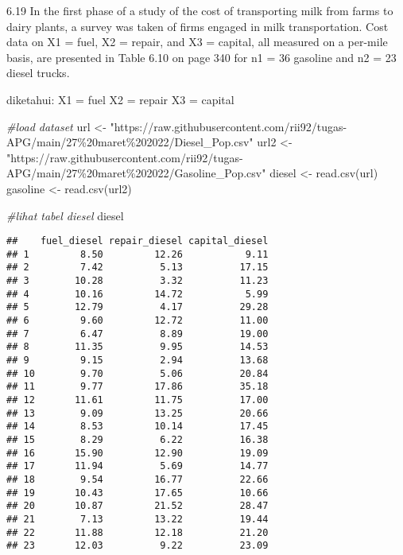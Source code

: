 \documentclass[
]{article}
\newenvironment{Shaded}{\begin{snugshade}}{\end{snugshade}}
\newcommand{\CommentTok}[1]{\textcolor[rgb]{0.56,0.35,0.01}{\textit{#1}}}
\newcommand{\FunctionTok}[1]{\textcolor[rgb]{0.00,0.00,0.00}{#1}}
\newcommand{\NormalTok}[1]{#1}
\newcommand{\OtherTok}[1]{\textcolor[rgb]{0.56,0.35,0.01}{#1}}
\newcommand{\StringTok}[1]{\textcolor[rgb]{0.31,0.60,0.02}{#1}}
\begin{document}
6.19 In the first phase of a study of the cost of transporting milk from
farms to dairy plants, a survey was taken of firms engaged in milk
transportation. Cost data on X1 = fuel, X2 = repair, and X3 = capital,
all measured on a per-mile basis, are presented in Table 6.10 on page
340 for n1 = 36 gasoline and n2 = 23 diesel trucks.

diketahui: X1 = fuel X2 = repair X3 = capital

\begin{Shaded}
\begin{Highlighting}[]
\CommentTok{\#load dataset}
\NormalTok{url }\OtherTok{\textless{}{-}} \StringTok{"https://raw.githubusercontent.com/rii92/tugas{-}APG/main/27\%20maret\%202022/Diesel\_Pop.csv"}
\NormalTok{url2 }\OtherTok{\textless{}{-}} \StringTok{"https://raw.githubusercontent.com/rii92/tugas{-}APG/main/27\%20maret\%202022/Gasoline\_Pop.csv"}
\NormalTok{diesel }\OtherTok{\textless{}{-}} \FunctionTok{read.csv}\NormalTok{(url)}
\NormalTok{gasoline }\OtherTok{\textless{}{-}} \FunctionTok{read.csv}\NormalTok{(url2)}
\end{Highlighting}
\end{Shaded}

\begin{Shaded}
\begin{Highlighting}[]
\CommentTok{\#lihat tabel diesel}
\NormalTok{diesel}
\end{Highlighting}
\end{Shaded}

\begin{verbatim}
##    fuel_diesel repair_diesel capital_diesel
## 1         8.50         12.26           9.11
## 2         7.42          5.13          17.15
## 3        10.28          3.32          11.23
## 4        10.16         14.72           5.99
## 5        12.79          4.17          29.28
## 6         9.60         12.72          11.00
## 7         6.47          8.89          19.00
## 8        11.35          9.95          14.53
## 9         9.15          2.94          13.68
## 10        9.70          5.06          20.84
## 11        9.77         17.86          35.18
## 12       11.61         11.75          17.00
## 13        9.09         13.25          20.66
## 14        8.53         10.14          17.45
## 15        8.29          6.22          16.38
## 16       15.90         12.90          19.09
## 17       11.94          5.69          14.77
## 18        9.54         16.77          22.66
## 19       10.43         17.65          10.66
## 20       10.87         21.52          28.47
## 21        7.13         13.22          19.44
## 22       11.88         12.18          21.20
## 23       12.03          9.22          23.09
\end{verbatim}
\end{document}
